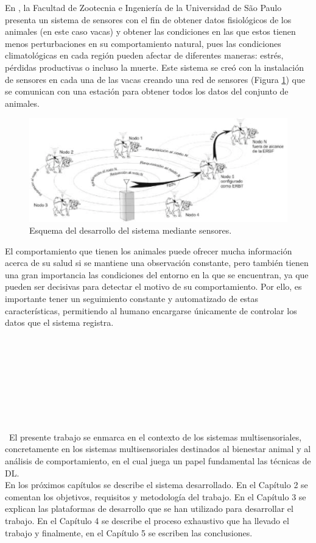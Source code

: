 En \cite{arce09}, la Facultad de Zootecnia e Ingeniería de la Universidad de São Paulo presenta un sistema de sensores con el fin de obtener datos fisiológicos de los animales (en este caso vacas) y obtener las condiciones en las que estos tienen menos perturbaciones en su comportamiento natural, pues las condiciones climatológicas en cada región pueden afectar de diferentes maneras: estrés, pérdidas productivas o incluso la muerte. Este sistema se creó con la instalación de sensores en cada una de las vacas creando una red de sensores (Figura \ref{fig:saopaulo}) que se comunican con una estación para obtener todos los datos del conjunto de animales.\\
\begin{figure} [h!]
  \begin{center}
    \includegraphics[width=14cm]{figs/saopaulo}
  \end{center}
  \caption{Esquema del desarrollo del sistema mediante sensores.}
  \label{fig:saopaulo}
\end{figure}

El comportamiento que tienen los animales puede ofrecer mucha información acerca de su salud si se mantiene una observación constante, pero también tienen una gran importancia las condiciones del entorno en la que se encuentran, ya que pueden ser decisivas para detectar el motivo de su comportamiento. Por ello, es importante tener un seguimiento constante y automatizado de estas características, permitiendo al humano encargarse únicamente de controlar los datos que el sistema registra.\\
\

\

\

\

\

\
El presente trabajo se enmarca en el contexto de los sistemas multisensoriales, concretamente en los sistemas multisensoriales destinados al bienestar animal y al análisis de comportamiento, en el cual juega un papel fundamental las técnicas de DL.\\

En los próximos capítulos se describe el sistema desarrollado. En el Capítulo 2 se comentan los objetivos, requisitos y metodología del trabajo. En el Capítulo 3 se explican las plataformas de desarrollo que se han utilizado para desarrollar el trabajo. En el Capítulo 4 se describe el proceso exhaustivo que ha llevado el trabajo y finalmente, en el Capítulo 5 se escriben las conclusiones.